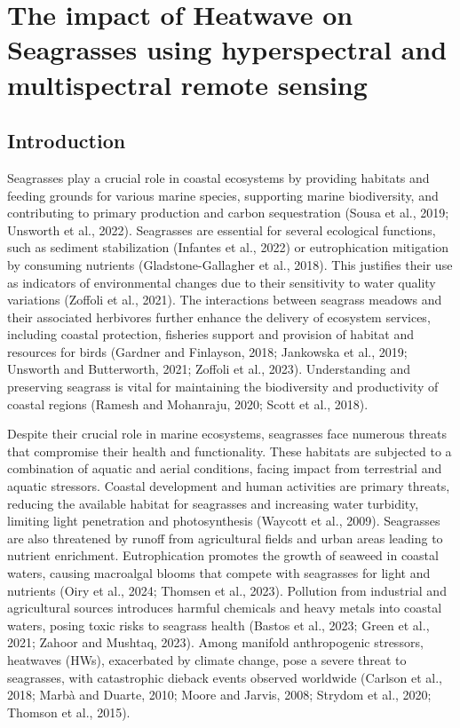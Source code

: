 \documentclass[
  letterpaper,
  11pt,
  english,
  singlespacing,
  headsepline]{MastersDoctoralThesis}
\begin{document}

\chapter{The impact of Heatwave on Seagrasses using hyperspectral and
multispectral remote
sensing}\label{the-impact-of-heatwave-on-seagrasses-using-hyperspectral-and-multispectral-remote-sensing}

\begin{spacing}{1.5}

\section{Introduction}\label{introduction-4}

Seagrasses play a crucial role in coastal ecosystems by providing
habitats and feeding grounds for various marine species, supporting
marine biodiversity, and contributing to primary production and carbon
sequestration (Sousa et al., 2019; Unsworth et al., 2022). Seagrasses
are essential for several ecological functions, such as sediment
stabilization (Infantes et al., 2022) or eutrophication mitigation by
consuming nutrients (Gladstone-Gallagher et al., 2018). This justifies
their use as indicators of environmental changes due to their
sensitivity to water quality variations (Zoffoli et al., 2021). The
interactions between seagrass meadows and their associated herbivores
further enhance the delivery of ecosystem services, including coastal
protection, fisheries support and provision of habitat and resources for
birds (Gardner and Finlayson, 2018; Jankowska et al., 2019; Unsworth and
Butterworth, 2021; Zoffoli et al., 2023). Understanding and preserving
seagrass is vital for maintaining the biodiversity and productivity of
coastal regions (Ramesh and Mohanraju, 2020; Scott et al., 2018).

Despite their crucial role in marine ecosystems, seagrasses face
numerous threats that compromise their health and functionality. These
habitats are subjected to a combination of aquatic and aerial
conditions, facing impact from terrestrial and aquatic stressors.
Coastal development and human activities are primary threats, reducing
the available habitat for seagrasses and increasing water turbidity,
limiting light penetration and photosynthesis (Waycott et al., 2009).
Seagrasses are also threatened by runoff from agricultural fields and
urban areas leading to nutrient enrichment. Eutrophication promotes the
growth of seaweed in coastal waters, causing macroalgal blooms that
compete with seagrasses for light and nutrients (Oiry et al., 2024;
Thomsen et al., 2023). Pollution from industrial and agricultural
sources introduces harmful chemicals and heavy metals into coastal
waters, posing toxic risks to seagrass health (Bastos et al., 2023;
Green et al., 2021; Zahoor and Mushtaq, 2023). Among manifold
anthropogenic stressors, heatwaves (HWs), exacerbated by climate change,
pose a severe threat to seagrasses, with catastrophic dieback events
observed worldwide (Carlson et al., 2018; Marbà and Duarte, 2010; Moore
and Jarvis, 2008; Strydom et al., 2020; Thomson et al., 2015).


\end{spacing}
\end{document}
